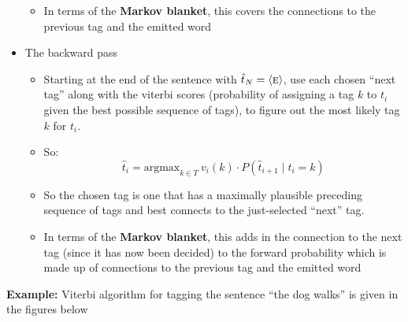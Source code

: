 \documentclass[11pt,letterpaper]{article}
\newcommand{\ngramend}{\ensuremath{\langle \textsc{e} \rangle}}
\newcommand{\tcurr}{\ensuremath{t_i}}
\begin{document}
\begin{itemize}
\begin{itemize}
      \item In terms of the \textbf{Markov blanket}, this covers the connections to the previous tag and the emitted word
    \end{itemize}
  \item The backward pass
    \begin{itemize}
      \item Starting at the end of the sentence with $\hat{t}_N=\ngramend$, use each chosen ``next tag'' along with the viterbi scores (probability of assigning a tag $k$ to $t_i$ given the best possible sequence of tags), to figure out the most likely tag $k$ for $t_i$.
      \item So:
        \[
          \hat{t}_i = \text{argmax}_{k \in T}~v_{i}(k) \cdot P(\hat{t}_{i+1} \mid t_i=k)
        \]
      \item So the chosen tag is one that has a maximally plausible preceding sequence of tags and best connects to the just-selected ``next'' tag.
      \item In terms of the \textbf{Markov blanket}, this adds in the connection to the next tag (since it has now been decided) to the forward probability which is made up of connections to the previous tag and the emitted word
    \end{itemize}
\end{itemize}


\textbf{Example:} Viterbi algorithm for tagging the sentence ``the dog walks'' is given in the figures below
\end{document}
